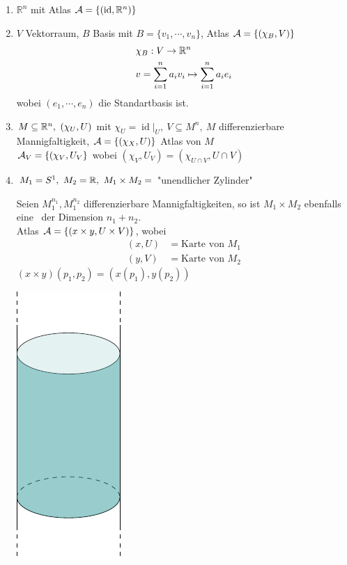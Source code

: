 \begin{bsp}
\begin{enumerate}
\item$\mathbb{R}^n$ mit Atlas $\mathcal{A} = \{(\operatorname{id}, \mathbb{R}^n)\}$
\item$V$ Vektorraum, $B$ Basis mit $B = \{v_1, \cdots, v_n\}$, Atlas $\mathcal{A} = \left\{(\chi_B, V)\right\}$
\begin{align*}
& \chi_B: V \rightarrow \mathbb{R}^n\\
& v = \sum^n_{i=1} a_i v_i \mapsto \sum_{i=1}^n a_i e_i
\end{align*}
wobei $(e_1, \cdots, e_n)$ die Standartbasis ist.
\item$M\subseteq \mathbb{R}^n,\ (\chi_U, U)$ mit $\chi_U = \operatorname{id}\vert_U,\ V \subseteq M^n,\ M$ differenzierbare Mannigfaltigkeit, $\mathcal{A} = \left\{(\chi_X, U)\right\}$ Atlas von $M$\\
$\mathcal{A}_V = \left\{(\chi_V, U_V\right\}$ wobei $(\chi_V, U_V) = (\chi_{U\cap V}, U\cap V)$
\item$M_1 = S^1,\ M_2 = \mathbb{R},\ M_1\times M_2 =$ "unendlicher Zylinder"

\hspace{.06\textwidth}
\begin{minipage}[H]{0.8\textwidth}
Seien $M_1^{n_1}, M_1^{n_2}$ differenzierbare Mannigfaltigkeiten, so ist $M_1\times M_2$ ebenfalls eine \difM \ der Dimension $n_1 + n_2$.\\
Atlas $\mathcal{A} = \left\{(x\times y, U\times V)\right\}$, wobei 
\begin{align*}
(x, U) &= \text{Karte von } M_1\\
(y, V) &= \text{Karte von } M_2
\end{align*}
$(x\times y)(p_1, p_2) = (x(p_1), y(p_2))$
\end{minipage}
\hspace{1cm}
\begin{minipage}[H]{.2\textwidth}
\vspace{-1.5cm}
\includegraphics[scale=0.5]{figures/tikz/cylinder.pdf}
\end{minipage}


\end{enumerate}
\end{bsp}
